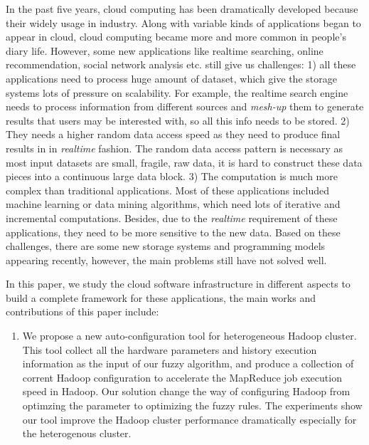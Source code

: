 \begin{eabstract}

In the past five years, cloud computing has been dramatically developed because their widely usage in industry. Along with variable kinds of applications began to appear in cloud, cloud computing became more and more common in people's diary life. However, some new applications like realtime searching, online recommendation, social network analysis etc. still give us challenges: 1) all these applications need to process huge amount of dataset, which give the storage systems lots of pressure on scalability. For example, the realtime search engine needs to process information from different sources and \textit{mesh-up} them to generate results that users may be interested with, so all this info needs to be stored. 2) They needs a higher random data access speed as they need to produce final results in in \textit{realtime} fashion. The random data access pattern is necessary as most input datasets are small, fragile, raw data, it is hard to construct these data pieces into a continuous large data block. 3) The computation is much more complex than traditional applications. Most of these applications included machine learning or data mining algorithms, which need lots of iterative and incremental computations. Besides, due to the \textit{realtime} requirement of these applications, they need to be more sensitive to the new data. Based on these challenges, there are some new storage systems and programming models appearing recently, however, the main problems still have not solved well.

In this paper, we study the cloud software infrastructure in different aspects to build a complete framework for these applications, the main works and contributions of this paper include:

\begin{enumerate}

  \item We propose a new auto-configuration tool for heterogeneous Hadoop cluster. This tool collect all the hardware parameters and history execution information as the input of our fuzzy algorithm, and produce a collection of corrent Hadoop configuration to accelerate the MapReduce job execution speed in Hadoop. Our solution change the way of configuring Hadoop from optimzing the parameter to optimizing the fuzzy rules. The experiments show our tool improve the Hadoop cluster performance dramatically especially for the heterogenous cluster.


\end{enumerate}
\end{eabstract}
